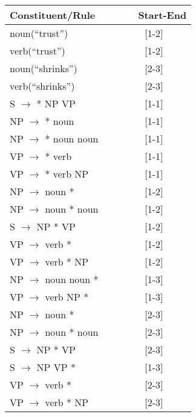 \documentclass[11pt]{article}
\begin{document}
\begin{enumerate}
\begin{center}
\begin{tabular}{lc} 
{\bf Constituent/Rule~~~} & {\bf ~~~Start-End} \\ \hline
noun(``trust'') &  [1-2] \\
verb(``trust'') & [1-2] \\
noun(``shrinks'') & [2-3] \\
verb(``shrinks'') & [2-3] \\
S $\rightarrow$ * NP VP & [1-1] \\
NP $\rightarrow$ * noun & [1-1] \\ 
NP $\rightarrow$ * noun noun & [1-1] \\ \hline
VP $\rightarrow$ * verb & [1-1] \\
VP $\rightarrow$ * verb NP & [1-1] \\
NP $\rightarrow$ noun * & [1-2]\\
NP $\rightarrow$ noun * noun & [1-2]\\
S $\rightarrow$ NP * VP & [1-2]\\
VP $\rightarrow$ verb * & [1-2]\\
VP $\rightarrow$ verb * NP & [1-2]\\
NP $\rightarrow$ noun noun * & [1-3]\\
VP $\rightarrow$ verb NP * & [1-3]\\
NP $\rightarrow$ noun * & [2-3]\\
NP $\rightarrow$ noun * noun & [2-3]\\
S $\rightarrow$ NP * VP & [2-3]\\
S $\rightarrow$ NP VP * & [1-3]\\
VP $\rightarrow$ verb * & [2-3]\\
VP $\rightarrow$ verb * NP & [2-3]\\
\end{tabular}
\end{center}



\end{enumerate}  %
\end{document}

